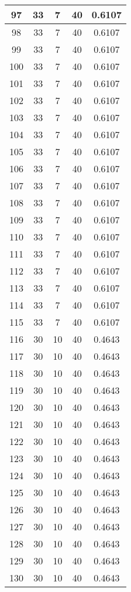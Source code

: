 \documentclass[letterpaper, 12pt]{article}
\begin{document}
\begin{longtable}{|c|c|c|c|c|}
\hline
97 & 33 & 7 & 40 & 0.6107 \\
\hline
98 & 33 & 7 & 40 & 0.6107 \\
\hline
99 & 33 & 7 & 40 & 0.6107 \\
\hline
100 & 33 & 7 & 40 & 0.6107 \\
\hline
101 & 33 & 7 & 40 & 0.6107 \\
\hline
102 & 33 & 7 & 40 & 0.6107 \\
\hline
103 & 33 & 7 & 40 & 0.6107 \\
\hline
104 & 33 & 7 & 40 & 0.6107 \\
\hline
105 & 33 & 7 & 40 & 0.6107 \\
\hline
106 & 33 & 7 & 40 & 0.6107 \\
\hline
107 & 33 & 7 & 40 & 0.6107 \\
\hline
108 & 33 & 7 & 40 & 0.6107 \\
\hline
109 & 33 & 7 & 40 & 0.6107 \\
\hline
110 & 33 & 7 & 40 & 0.6107 \\
\hline
111 & 33 & 7 & 40 & 0.6107 \\
\hline
112 & 33 & 7 & 40 & 0.6107 \\
\hline
113 & 33 & 7 & 40 & 0.6107 \\
\hline
114 & 33 & 7 & 40 & 0.6107 \\
\hline
115 & 33 & 7 & 40 & 0.6107 \\
\hline
116 & 30 & 10 & 40 & 0.4643 \\
\hline
117 & 30 & 10 & 40 & 0.4643 \\
\hline
118 & 30 & 10 & 40 & 0.4643 \\
\hline
119 & 30 & 10 & 40 & 0.4643 \\
\hline
120 & 30 & 10 & 40 & 0.4643 \\
\hline
121 & 30 & 10 & 40 & 0.4643 \\
\hline
122 & 30 & 10 & 40 & 0.4643 \\
\hline
123 & 30 & 10 & 40 & 0.4643 \\
\hline
124 & 30 & 10 & 40 & 0.4643 \\
\hline
125 & 30 & 10 & 40 & 0.4643 \\
\hline
126 & 30 & 10 & 40 & 0.4643 \\
\hline
127 & 30 & 10 & 40 & 0.4643 \\
\hline
128 & 30 & 10 & 40 & 0.4643 \\
\hline
129 & 30 & 10 & 40 & 0.4643 \\
\hline
130 & 30 & 10 & 40 & 0.4643 \\

\end{longtable}
\end{document}
